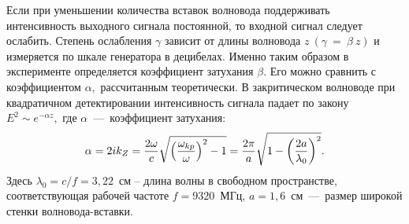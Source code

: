 Если при уменьшении количества вставок волновода поддерживать интенсивность
выходного сигнала постоянной, то входной сигнал следует ослабить. Степень
ослабления $\gamma$ зависит от длины волновода $z~(\gamma~=~\beta~z)$ и
измеряется по шкале генератора в децибелах. Именно таким образом в эксперименте
определяется коэффициент затухания $\beta.$ Его можно сравнить с коэффициентом
$\alpha,$ рассчитанным теоретически. В закритическом волноводе при квадратичном
детектировании интенсивность сигнала падает по закону $E^2\sim e^{-\alpha z},$
где $\alpha$~---~коэффициент затухания: 
\begin{equation} \eqmark{2.0.7}
\alpha=2ik_{Z}=\dfrac{2\omega}{c}\sqrt{\left(\dfrac{\omega_{kp}}{\omega}\right)^2-1}=
\dfrac{2\pi}{a}\sqrt{1-\left(\dfrac{2a}{\lambda_0}\right)^2}. 
\end{equation} 
Здесь $\lambda_0=c/f=3,22$~см – длина волны в свободном пространстве, 
соответствующая рабочей частоте $f=9320$~МГц, $a=1,6$~см~---~размер широкой 
стенки волновода-вставки.

